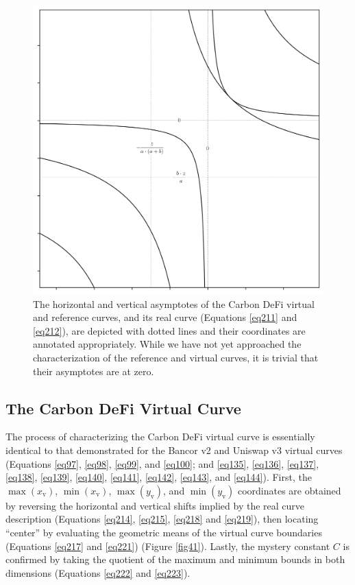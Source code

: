 \documentclass{article}
\begin{document}
\begin{figure}[ht]
    \centering
    \includegraphics[width=\textwidth]{fig40.png}
    \captionsetup{
        justification=raggedright,
        singlelinecheck=false,
        font=small,
        labelfont=bf,
        labelsep=quad,
        format=plain
    }
    \caption{The horizontal and vertical asymptotes of the Carbon DeFi virtual and reference curves, and its real curve (Equations \ref{eq211} and \ref{eq212}), are depicted with dotted lines and their coordinates are annotated appropriately. While we have not yet approached the characterization of the reference and virtual curves, it is trivial that their asymptotes are at zero.}
    \label{fig40}
\end{figure}

\subsection{The Carbon DeFi Virtual Curve}\label{subsec4.5}

The process of characterizing the Carbon DeFi virtual curve is essentially identical to that demonstrated for the Bancor v2 and Uniswap v3 virtual curves (Equations \ref{eq97}, \ref{eq98}, \ref{eq99}, and \ref{eq100}; and \ref{eq135}, \ref{eq136}, \ref{eq137}, \ref{eq138}, \ref{eq139}, \ref{eq140}, \ref{eq141}, \ref{eq142}, \ref{eq143}, and \ref{eq144}). First, the $\max(x_{\text{v}})$, $\min(x_{\text{v}})$, $\max(y_{\text{v}})$, and $\min(y_{\text{v}})$ coordinates are obtained by reversing the horizontal and vertical shifts implied by the real curve description (Equations \ref{eq214}, \ref{eq215}, \ref{eq218} and \ref{eq219}), then locating “center” by evaluating the geometric means of the virtual curve boundaries (Equations \ref{eq217} and \ref{eq221}) (Figure \ref{fig41}). Lastly, the mystery constant $C$ is confirmed by taking the quotient of the maximum and minimum bounds in both dimensions (Equations \ref{eq222} and \ref{eq223}).
\end{document}
